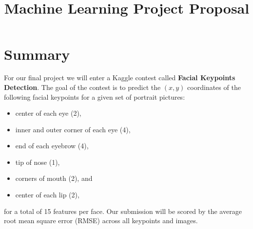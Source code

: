 \documentclass[conference]{IEEEtran}
\begin{document}
\title{Machine Learning Project Proposal}
\author{
\and
{}
}

\maketitle

\section{Summary}
For our final project we will enter a Kaggle contest called \textbf{Facial Keypoints Detection}. The goal of the contest is to predict the $(x,y)$ coordinates of the following facial keypoints for a given set of portrait pictures:
\begin{itemize}
\item center of each eye (2),
\item inner and outer corner of each eye (4),
\item end of each eyebrow (4),
\item tip of nose (1),
\item corners of mouth (2), and
\item center of each lip (2),
\end{itemize}
for a total of 15 features per face. Our submission will be scored by the average root mean square error (RMSE) across all keypoints and images.
\end{document}
